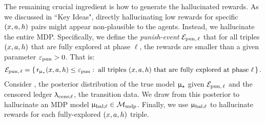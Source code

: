 The remaining crucial ingredient is how to generate the hallucinated rewards. As we discussed in ``Key Ideas", directly hallucinating low rewards for specific $(x,a,h)$ pairs might appear non-plausible to the agents. Instead, we hallucinate the entire MDP. Specifically, we define the \emph{punish-event} $\mathcal{E}_{\mathrm{pun},\,\ell}$ that for all triples $(x,a,h)$ that are fully explored at phase $\ell$, the rewards are smaller than a given parameter
$\varepsilon_{\mathrm{pun}}>0$. That is:
\begin{align}\label{eq:punish-event-defn}
\mathcal{E}_{\mathrm{pun},\,\ell} = \left\{\, \mathsf{r}_{\upmu_{\star}}(x,a,h) \le \varepsilon_{\mathrm{pun}}: \;
                \text{all triples $(x,a,h)$ that are fully explored at phase $\ell$}\,\right\}.
\end{align}
Consider , the posterior distribution of the true model $\upmu_{\star}$ given $\mathcal{E}_{\mathrm{pun},\,\ell}$ and the censored ledger $\uplambda_{\mathrm{cens};\ell}$, \ie the transition data. We draw from this posterior to hallucinate an MDP model $\upmu_{\mathrm{hal};\ell}\in \mathcal{M}_{\mathrm{mdp}}$. Finally, we use $\upmu_{\mathrm{hal};\ell}$ to hallucinate rewards for each fully-explored $(x,a,h)$ triple.

\begin{comment}; {see \Cref{eq:modhalll,eq:hallucinate_rewards,eq:hallucinate_trajectories,eq:hallucinate_ledger} for a symbolic description.}\end{comment}




